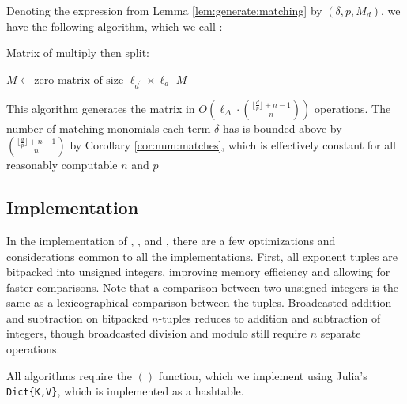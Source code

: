 Denoting the expression from Lemma \ref{lem:generate:matching} 
by $(\delta, p, M_d)$, we have
the following algorithm, which we call \wicsalg:

\begin{algorithm}[H]
    \caption{Matrix of multiply then split: \wicsalg}
    $M \gets \text{zero matrix of size } \ell_{d^\prime} \times \ell_d $\;
    \Return $M$
    \label{alg:matrix:WICS}
\end{algorithm}

This algorithm 
generates the matrix in 
$O \left( \ell_{\Delta} \cdot \binom{\lfloor \frac{d}{p} \rfloor + n - 1}{n} \right)$ operations.
The number of matching monomials each term $\delta$ 
has is bounded above by $\binom{\lfloor \frac{d}{p} \rfloor + n - 1}{n}$ 
by Corollary \ref{cor:num:matches}, which is 
effectively constant for all reasonably computable $n$ and $p$

\subsection{Implementation}

In the implementation of \triv, \merge, and \wicsalg, there are a 
few optimizations and considerations common to all the implementations.
First, all exponent tuples are bitpacked into 
unsigned integers, improving memory efficiency 
and allowing for faster comparisons.
Note that a comparison between two unsigned integers 
is the same as a lexicographical comparison between the tuples.
Broadcasted addition and subtraction on bitpacked 
$n$-tuples reduces to addition and subtraction of 
integers, though broadcasted division and modulo still 
require $n$ separate operations.

All algorithms require the $()$ function, 
which we implement using Julia's \texttt{Dict\{K,V\}}, 
which is implemented as a hashtable.

